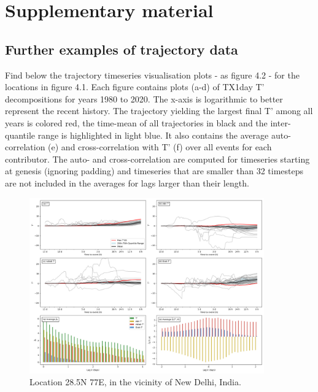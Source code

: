 \chapter{Supplementary material}

\section{Further examples of trajectory data}

Find below the trajectory timeseries visualisation plots - as figure 4.2 - for the locations in figure 4.1. Each figure contains plots (a-d) of TX1day T’ decompositions for years 1980 to 2020. The x-axis is logarithmic to better represent the recent
 history. The trajectory yielding the largest final T’ among all years is colored red, the
 time-mean of all trajectories in black and the inter-quantile range is highlighted in light
 blue. It also contains the average auto-correlation (e) and cross-correlation with T’ (f) over all events
 for each contributor. The auto- and cross-correlation are computed for timeseries starting
 at genesis (ignoring padding) and timeseries that are smaller than 32 timesteps are not
 included in the averages for lags larger than their length.

\begin{figure}[h]
\caption{Location 28.5N 77E, in the vicinity of New Delhi, India.}
\centering
\includegraphics[width=0.9\textwidth]{images/sup1.png}
\end{figure}

